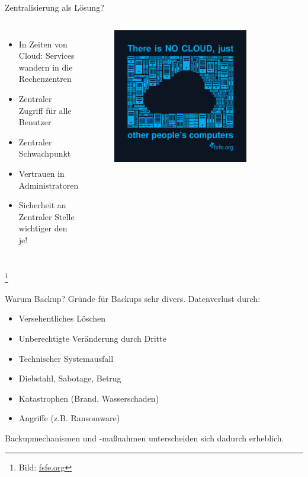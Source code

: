 \documentclass[10pt]{beamer}
\newcommand\blfootnote[1]{%
	\begingroup
	\renewcommand\thefootnote{}\footnote{#1}%
	\addtocounter{footnote}{-1}%
	\endgroup
}
\begin{document}
%
%
\begin{frame}[fragile]{Zentralisierung als Lösung?}
\begin{columns}[T,c,onlytextwidth]
	\begin{itemize}
		\item In Zeiten von Cloud: Services wandern in die Rechenzentren
		\item Zentraler Zugriff für alle Benutzer
		\item Zentraler Schwachpunkt
		\item Vertrauen in Administratoren
		\item Sicherheit an Zentraler Stelle wichtiger den je!
	\end{itemize}

 \begin{figure}
	\includegraphics[width=0.8\textwidth]{images/thereisnocloud-v2}
\end{figure}
\end{columns}
	\blfootnote{Bild: \href{https://fsfe.org}{fsfe.org}}
\end{frame}

%
%
\begin{frame}[fragile]{Warum Backup?}
Gründe für Backups sehr divers. Datenverlust durch:
	\begin{itemize}
	\item Versehentliches Löschen
	\item Unberechtigte Veränderung durch Dritte
	\item Technischer Systemausfall
	\item Diebstahl, Sabotage, Betrug
	\item Katastrophen (Brand, Wasserschaden)
	\item Angriffe (z.B. Ransomware)
\end{itemize}
Backupmechanismen und -maßnahmen unterscheiden sich dadurch erheblich.
\end{frame}
\end{document}
